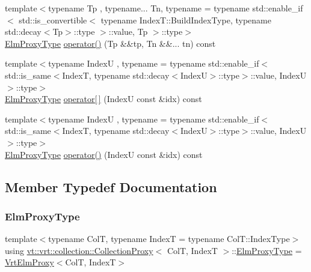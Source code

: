 \begin{DoxyCompactItemize}
\item 
{\footnotesize template$<$typename Tp , typename... Tn, typename  = typename std\+::enable\+\_\+if$<$      std\+::is\+\_\+convertible$<$        typename Index\+T\+::\+Build\+Index\+Type, typename std\+::decay$<$\+Tp$>$\+::type      $>$\+::value, Tp    $>$\+::type$>$ }\\\hyperlink{structvt_1_1vrt_1_1collection_1_1_collection_proxy_a892c21eae1dca37321d7973f72b55b0a}{Elm\+Proxy\+Type} \hyperlink{structvt_1_1vrt_1_1collection_1_1_collection_proxy_a8a06bed8946060c4d1e11f665e05e64f}{operator()} (Tp \&\&tp, Tn \&\&... tn) const
\item 
{\footnotesize template$<$typename IndexU , typename  = typename std\+::enable\+\_\+if$<$      std\+::is\+\_\+same$<$\+Index\+T, typename std\+::decay$<$\+Index\+U$>$\+::type$>$\+::value, Index\+U    $>$\+::type$>$ }\\\hyperlink{structvt_1_1vrt_1_1collection_1_1_collection_proxy_a892c21eae1dca37321d7973f72b55b0a}{Elm\+Proxy\+Type} \hyperlink{structvt_1_1vrt_1_1collection_1_1_collection_proxy_a81f027fb0c7d2b55ec06a2f91dd8d72e}{operator\mbox{[}$\,$\mbox{]}} (IndexU const \&idx) const
\item 
{\footnotesize template$<$typename IndexU , typename  = typename std\+::enable\+\_\+if$<$      std\+::is\+\_\+same$<$\+Index\+T, typename std\+::decay$<$\+Index\+U$>$\+::type$>$\+::value, Index\+U    $>$\+::type$>$ }\\\hyperlink{structvt_1_1vrt_1_1collection_1_1_collection_proxy_a892c21eae1dca37321d7973f72b55b0a}{Elm\+Proxy\+Type} \hyperlink{structvt_1_1vrt_1_1collection_1_1_collection_proxy_a53d97b9ca0294b4254556620463708d9}{operator()} (IndexU const \&idx) const
\end{DoxyCompactItemize}


\subsection{Member Typedef Documentation}
\mbox{\label{structvt_1_1vrt_1_1collection_1_1_collection_proxy_a892c21eae1dca37321d7973f72b55b0a}} 
\subsubsection{\texorpdfstring{Elm\+Proxy\+Type}{ElmProxyType}}
{\footnotesize\ttfamily template$<$typename ColT, typename IndexT = typename Col\+T\+::\+Index\+Type$>$ \\
using \hyperlink{structvt_1_1vrt_1_1collection_1_1_collection_proxy}{vt\+::vrt\+::collection\+::\+Collection\+Proxy}$<$ ColT, IndexT $>$\+::\hyperlink{structvt_1_1vrt_1_1collection_1_1_collection_proxy_a892c21eae1dca37321d7973f72b55b0a}{Elm\+Proxy\+Type} =  \hyperlink{structvt_1_1vrt_1_1collection_1_1_vrt_elm_proxy}{Vrt\+Elm\+Proxy}$<$ColT, IndexT$>$}



